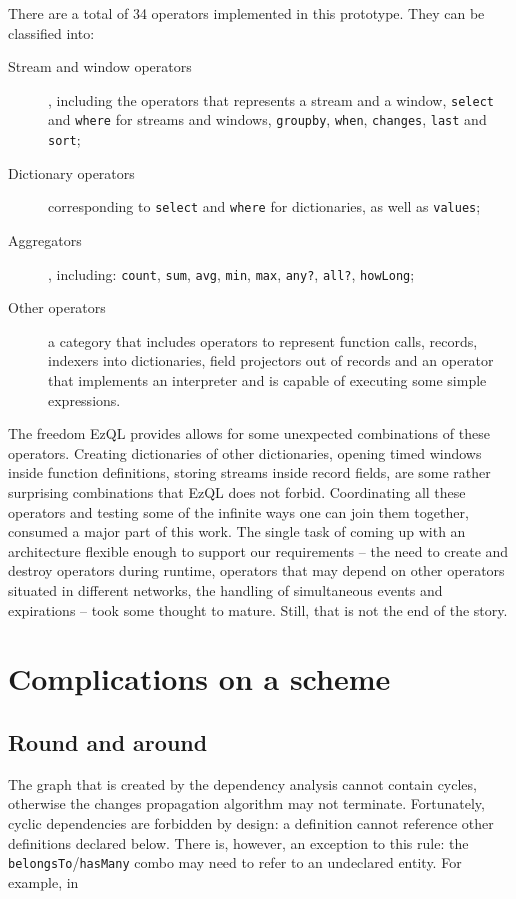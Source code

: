 There are a total of 34 operators implemented in this prototype. They
can be classified into:

\begin{description}
\item[Stream and window operators], including the operators that
  represents a stream and a window, \verb=select= and \verb=where= for
  streams and windows, \verb=groupby=, \verb=when=, \verb=changes=,
  \verb=last= and \verb=sort=;
\item[Dictionary operators] corresponding to \verb=select= and
  \verb=where= for dictionaries, as well as \verb=values=;
\item[Aggregators], including: \verb=count=, \verb=sum=, \verb=avg=,
  \verb=min=, \verb=max=, \verb=any?=, \verb=all?=, \verb=howLong=;
\item[Other operators] a category that includes operators to represent
  function calls, records, indexers into dictionaries, field
  projectors out of records and an operator that implements an
  interpreter and is capable of executing some simple expressions.
\end{description}

The freedom EzQL provides allows for some unexpected combinations of
these operators. Creating dictionaries of other dictionaries, opening
timed windows inside function definitions, storing streams inside
record fields, are some rather surprising combinations that EzQL does
not forbid. Coordinating all these operators and testing some of the
infinite ways one can join them together, consumed a major part of
this work. The single task of coming up with an architecture flexible
enough to support our requirements -- the need to create and destroy
operators during runtime, operators that may depend on other operators
situated in different networks, the handling of simultaneous events
and expirations -- took some thought to mature. Still, that is not the
end of the story.

\section{Complications on a scheme}
\label{sub:complications}

\subsection{Round and around}

The graph that is created by the dependency analysis cannot contain
cycles, otherwise the changes propagation algorithm may not
terminate. Fortunately, cyclic dependencies are forbidden by design: a
definition cannot reference other definitions declared below. There
is, however, an exception to this rule: the
\verb=belongsTo=/\verb=hasMany= combo may need to refer to an
undeclared entity. For example, in

